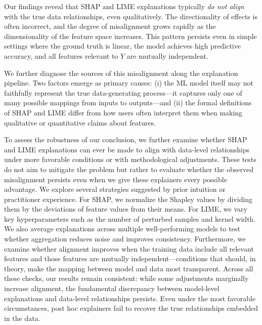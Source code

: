 \documentclass[mnsc,blindrev]{informs3}
\begin{document}
Our findings reveal that SHAP and LIME explanations typically \emph{do not align} with the true data relationships, even qualitatively. The directionality of effects is often incorrect, and the degree of misalignment grows rapidly as the dimensionality of the feature space increases. This pattern persists even in simple settings where the ground truth is linear, the model achieves high predictive accuracy, and all features relevant to 
$Y$ are mutually independent.

We further diagnose the sources of this misalignment along the explanation pipeline. Two factors emerge as primary causes: (i) the ML model itself may not faithfully represent the true data-generating process—it captures only one of many possible mappings from inputs to outputs—and (ii) the formal definitions of SHAP and LIME differ from how users often interpret them when making qualitative or quantitative claims about features.

To assess the robustness of our conclusion, we further examine whether SHAP and LIME explanations can ever be made to align with data-level relationships under more favorable conditions or with methodological adjustments. These tests do not aim to mitigate the problem but rather to evaluate whether the observed misalignment persists even when we give these explainers every possible advantage. We explore several strategies suggested by prior intuition or practitioner experience. For SHAP, we normalize the Shapley values by dividing them by the deviations of feature values from their means. For LIME, we vary key hyperparameters such as the number of perturbed samples and kernel width. We also average explanations across multiple well-performing models to test whether aggregation reduces noise and improves consistency. Furthermore, we examine whether alignment improves when the training data include all relevant features and those features are mutually independent—conditions that should, in theory, make the mapping between model and data most transparent. Across all these checks, our results remain consistent: while some adjustments marginally increase alignment, the fundamental discrepancy between model-level explanations and data-level relationships persists. Even under the most favorable circumstances, post hoc explainers fail to recover the true relationships embedded in the data.
\end{document}
